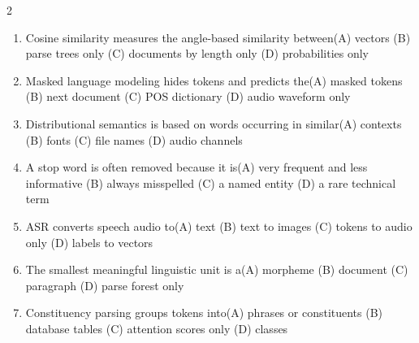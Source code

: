 \documentclass[a4paper]{article}
\begin{document}
\begin{multicols*}{2}
\begin{enumerate}
\item Cosine similarity measures the angle-based similarity between\newline\hspace*{0.6em}(A) vectors \quad (B) parse trees only \newline\hspace*{0.6em}(C) documents by length only \quad (D) probabilities only
\item Masked language modeling hides tokens and predicts the\newline\hspace*{0.6em}(A) masked tokens \quad (B) next document \newline\hspace*{0.6em}(C) POS dictionary \quad (D) audio waveform only
\item Distributional semantics is based on words occurring in similar\newline\hspace*{0.6em}(A) contexts \quad (B) fonts \newline\hspace*{0.6em}(C) file names \quad (D) audio channels
\item A stop word is often removed because it is\newline\hspace*{0.6em}(A) very frequent and less informative \quad (B) always misspelled \newline\hspace*{0.6em}(C) a named entity \quad (D) a rare technical term
\item ASR converts speech audio to\newline\hspace*{0.6em}(A) text \quad (B) text to images \newline\hspace*{0.6em}(C) tokens to audio only \quad (D) labels to vectors
\item The smallest meaningful linguistic unit is a\newline\hspace*{0.6em}(A) morpheme \quad (B) document \newline\hspace*{0.6em}(C) paragraph \quad (D) parse forest only
\item Constituency parsing groups tokens into\newline\hspace*{0.6em}(A) phrases or constituents \quad (B) database tables \newline\hspace*{0.6em}(C) attention scores only \quad (D) classes

\end{enumerate}
\end{multicols*}
\end{document}
